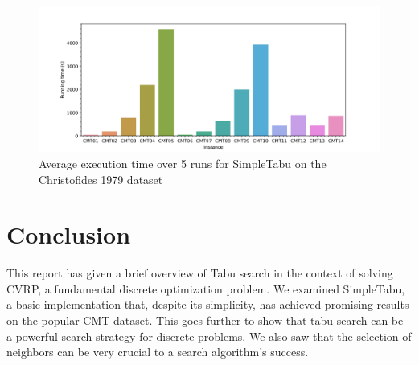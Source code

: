 \documentclass[12pt]{report}
\begin{document}
\begin{figure}
    \centering
    \includegraphics[width=\textwidth]{images/runtime_cmt.jpg}
    \caption{Average execution time over 5 runs for SimpleTabu on the Christofides 1979 dataset}
\end{figure}

\chapter{Conclusion}
This report has given a brief overview of Tabu search in the context of solving CVRP, a fundamental discrete optimization problem. We examined SimpleTabu, a basic implementation that, despite its simplicity, has achieved promising results on the popular CMT dataset. This goes further to show that tabu search can be a powerful search strategy for discrete problems. We also saw that the selection of neighbors can be very crucial to a search algorithm's success.



\end{document}
